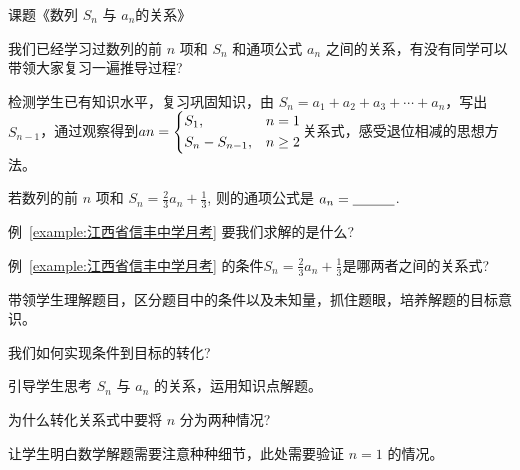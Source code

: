 课题《数列 $S_n$ 与 $a_n$的关系》

\begin{question}
  我们已经学习过数列的前 $n$ 项和 $S_n$ 和通项公式 $a_n$ 之间的关系，有没有同学可以带领大家复习一遍推导过程?
\end{question}

\begin{designgoal}
  检测学生已有知识水平，复习巩固知识，由 $S_n=a_1+a_2+a_3+ \cdots +a_n$，写出 $S_{n-1}$，通过观察得到$an= 
  \begin{dcases}
    S_1, & n = 1\\
    S_n - S_{n-1}, & n\geq 2
  \end{dcases}
$关系式，感受退位相减的思想方法。
\end{designgoal}

\begin{example}[2020·江西省信丰中学月考]\label{example:江西省信丰中学月考}
  若数列的前 $n$ 项和 $S_{n}=\frac{2}{3} a_{n}+\frac{1}{3}$, 则的通项公式是 $a_{n}= \underline{\hspace*{3em}}$.
\end{example}


\begin{question}
  例~\ref{example:江西省信丰中学月考} 要我们求解的是什么?
\end{question}

\begin{question}
  例~\ref{example:江西省信丰中学月考} 的条件$S_{n}=\frac{2}{3} a_{n}+\frac{1}{3}$是哪两者之间的关系式?
\end{question}


\begin{designgoal}
  带领学生理解题目，区分题目中的条件以及未知量，抓住题眼，培养解题的目标意识。
\end{designgoal}

\begin{question}
  我们如何实现条件到目标的转化?
\end{question}

\begin{designgoal}
  引导学生思考 $S_n$ 与 $a_n$ 的关系，运用知识点解题。
\end{designgoal}

\begin{question}
  为什么转化关系式中要将 $n$ 分为两种情况?
\end{question}

\begin{designgoal}
  让学生明白数学解题需要注意种种细节，此处需要验证 $n=1$ 的情况。
\end{designgoal}

